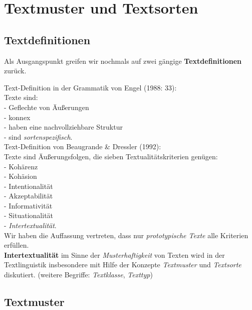 \documentclass[
  letterpaper,
]{scrbook}
\begin{document}
\hypertarget{textmuster-und-textsorten}{%
\chapter{Textmuster und Textsorten}\label{textmuster-und-textsorten}}

\hypertarget{textdefinitionen}{%
\section{Textdefinitionen}\label{textdefinitionen}}

Als Ausgangspunkt greifen wir nochmals auf zwei gängige
\textbf{Textdefinitionen} zurück.

Text-Definition in der Grammatik von Engel (1988: 33):\\
Texte sind:\\
- Geflechte von Äußerungen\\
- konnex\\
- haben eine nachvollziehbare Struktur\\
- sind \emph{sortenspezifisch}.\\

Text-Definition von Beaugrande \& Dressler (1992):\\
Texte sind Äußerungsfolgen, die sieben Textualitätskriterien genügen:\\
- Kohärenz\\
- Kohäsion\\
- Intentionalität\\
- Akzeptabilität\\
- Informativität\\
- Situationalität\\
- \emph{Intertextualität}.\\

Wir haben die Auffassung vertreten, dass nur \emph{prototypische Texte}
alle Kriterien erfüllen.\\

\textbf{Intertextualität} im Sinne der \emph{Musterhaftigkeit} von
Texten wird in der Textlinguistik insbesondere mit Hilfe der Konzepte
\emph{Textmuster} und \emph{Textsorte} diskutiert. (weitere Begriffe:
\emph{Textklasse}, \emph{Texttyp})

\hypertarget{textmuster}{%
\section{Textmuster}\label{textmuster}}
\end{document}
